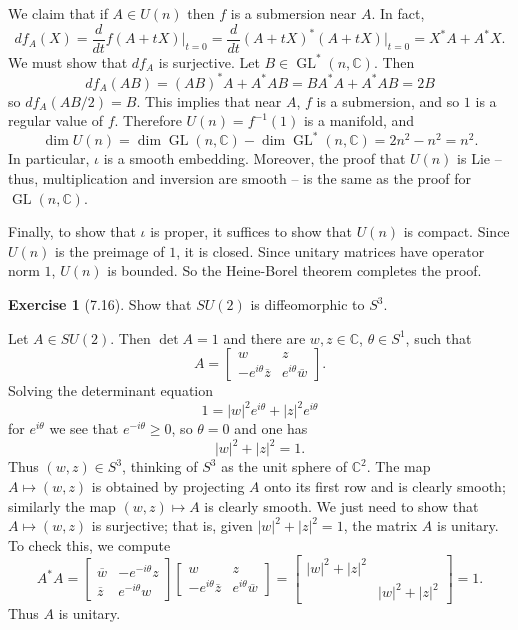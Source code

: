 \documentclass[10pt]{article}
\newcommand{\CC}{\mathbb{C}}
\newcommand{\GL}{\operatorname{GL}}
\theoremstyle{definition}
\newtheorem{exer}{Exercise}
\begin{document}
We claim that if $A \in U(n)$ then $f$ is a submersion near $A$.
In fact,
$$df_A(X) = \frac{d}{dt} f(A + tX)\bigg|_{t=0} = \frac{d}{dt} (A + tX)^*(A + tX)\bigg|_{t=0} = X^*A + A^*X.$$
We must show that $df_A$ is surjective.
Let $B \in \GL^*(n, \CC)$. Then
$$df_A(AB) = (AB)^*A + A^*AB = BA^*A + A^*AB = 2B$$
so $df_A(AB/2) = B$. This implies that near $A$, $f$ is a submersion, and so $1$ is a regular value of $f$.
Therefore $U(n) = f^{-1}(1)$ is a manifold, and
$$\dim U(n) = \dim \GL(n, \CC) - \dim \GL^*(n, \CC) = 2n^2 - n^2 = n^2.$$
In particular, $\iota$ is a smooth embedding.
Moreover, the proof that $U(n)$ is Lie -- thus, multiplication and inversion are smooth -- is the same as the proof for $\GL(n, \CC)$.

Finally, to show that $\iota$ is proper, it suffices to show that $U(n)$ is compact.
Since $U(n)$ is the preimage of $1$, it is closed.
Since unitary matrices have operator norm $1$, $U(n)$ is bounded.
So the Heine-Borel theorem completes the proof.


\begin{exer}[7.16]
Show that $SU(2)$ is diffeomorphic to $S^3$.
\end{exer}

Let $A \in SU(2)$. Then $\det A = 1$ and there are $w, z \in \CC$, $\theta \in S^1$, such that
$$A = \begin{bmatrix}
w & z \\
-e^{i\theta}\overline z & e^{i\theta}\overline w
\end{bmatrix}.$$
Solving the determinant equation
$$1 = |w|^2 e^{i\theta} + |z|^2 e^{i\theta}$$
for $e^{i\theta}$ we see that $e^{-i\theta} \geq 0$, so $\theta = 0$ and one has
$$|w|^2 + |z|^2 = 1.$$
Thus $(w, z) \in S^3$, thinking of $S^3$ as the unit sphere of $\CC^2$.
The map $A \mapsto (w, z)$ is obtained by projecting $A$ onto its first row and is clearly smooth; similarly the map $(w, z) \mapsto A$ is clearly smooth.
We just need to show that $A \mapsto (w, z)$ is surjective; that is, given $|w|^2 + |z|^2 = 1$, the matrix $A$ is unitary. To check this, we compute
$$A^*A = \begin{bmatrix}
\overline w & -e^{-i\theta}z\\
\overline z & e^{-i\theta} w
\end{bmatrix}\begin{bmatrix}
w & z \\
-e^{i\theta}\overline z & e^{i\theta}\overline w
\end{bmatrix}
= \begin{bmatrix}|w|^2 + |z|^2 \\ & |w|^2 + |z|^2\end{bmatrix}
= 1.
$$
Thus $A$ is unitary.
\end{document}
